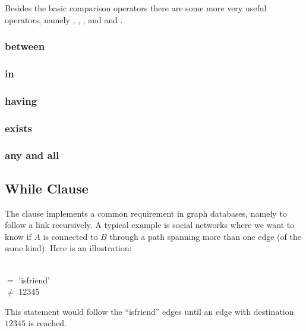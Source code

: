 Besides the basic comparison operators
there are some more very useful operators,
namely
,
,
,
 and
 and .

\subsubsection{between}

\subsubsection{in}

\subsubsection{having}

\subsubsection{exists}

\subsubsection{any and all}

\subsection{While Clause}
The  clause implements a common requirement
in graph databases, namely to follow a link recursively.
A typical example is social networks where we want to
know if $A$ is connected to $B$ through a path spanning
more than one edge (of the same kind).
Here is an illustration:

\begin{minipage}{\textwidth}
 
  \\
  $=$ 'isfriend' \\
  $\neq$ 12345 
\end{minipage}

This statement would follow the ``isfriend'' edges
until an edge with destination $12345$ is reached.

